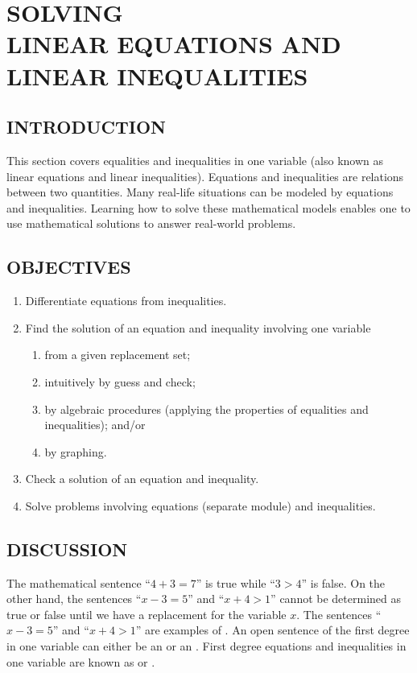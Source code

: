 \chapter[SOLVING LINEAR EQUATIONS AND LINEAR INEQUALITIES]{SOLVING\\ LINEAR EQUATIONS AND\\ LINEAR INEQUALITIES}
\section*{INTRODUCTION}
This section covers equalities and inequalities in one variable (also known as linear equations
and linear inequalities). Equations and inequalities are relations between two quantities. Many real-life situations can be modeled by equations and inequalities. Learning how to solve these
mathematical models enables one to use mathematical solutions to answer real-world problems.
\section*{OBJECTIVES}
\begin{enumerate}
\item Differentiate equations from inequalities.
\item Find the solution of an equation and inequality involving one variable
\begin{enumerate}
  \item from a given replacement set;
	\item intuitively by guess and check;
	\item by algebraic procedures (applying the properties of equalities and inequalities); and/or
	\item by graphing.
\end{enumerate}
\item Check a solution of an equation and inequality.
\item Solve problems involving equations (separate module) and inequalities.
\end{enumerate}
\section*{DISCUSSION}
The mathematical sentence “$4 + 3 = 7$” is true while “$3 > 4$” is false. On the other hand, the
sentences “$x - 3 = 5$” and “$x + 4 > 1$” cannot be determined as true or false until we have a
replacement for the variable $x$. The sentences “$x - 3 = 5$” and “$x + 4 > 1$” are examples of . An open sentence of the first degree in one variable can either be an  or an
. First degree equations and inequalities in one variable are known as  or
.

